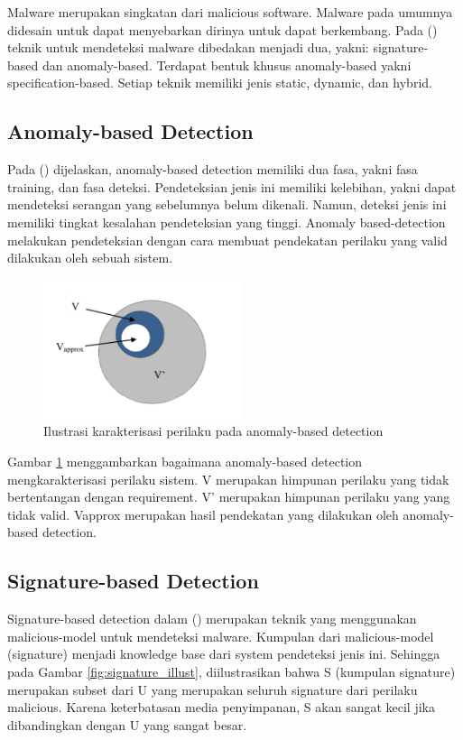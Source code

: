 Malware merupakan singkatan dari malicious software. Malware pada umumnya didesain untuk dapat menyebarkan dirinya untuk dapat berkembang. Pada (\cite{idika2007survey}) teknik untuk mendeteksi malware dibedakan menjadi dua, yakni: signature-
based dan anomaly-based. Terdapat bentuk khusus anomaly-based yakni specification-based. Setiap teknik memiliki jenis static, dynamic, dan hybrid.

\subsection{Anomaly-based Detection}

Pada (\cite{idika2007survey}) dijelaskan, anomaly-based detection memiliki dua fasa, yakni fasa training, dan fasa deteksi. Pendeteksian jenis ini memiliki kelebihan, yakni dapat mendeteksi serangan yang sebelumnya belum dikenali. Namun, deteksi jenis ini memiliki tingkat kesalahan pendeteksian yang tinggi. Anomaly based-detection melakukan pendeteksian dengan cara membuat pendekatan perilaku yang valid dilakukan oleh sebuah sistem.

\begin{figure}[H]
	\centering
	\includegraphics[width=220px]{resources/anomaly_illustration.png}
	\caption{Ilustrasi karakterisasi perilaku pada anomaly-based detection}
	\label{fig:anomaly_illust}
\end{figure}

Gambar \ref{fig:anomaly_illust} menggambarkan bagaimana anomaly-based detection mengkarakterisasi perilaku sistem. V merupakan himpunan perilaku yang tidak bertentangan dengan requirement. V’ merupakan himpunan perilaku yang yang tidak valid. Vapprox merupakan hasil pendekatan yang dilakukan oleh anomaly-based detection.

\subsection{Signature-based Detection}
Signature-based detection dalam (\cite{idika2007survey}) merupakan teknik yang menggunakan malicious-model untuk mendeteksi malware. Kumpulan dari malicious-model (signature) menjadi knowledge base dari system pendeteksi jenis ini. Sehingga pada Gambar \ref{fig:signature_illust}, diilustrasikan bahwa S (kumpulan signature) merupakan subset dari U yang merupakan seluruh signature dari perilaku malicious. Karena keterbatasan media penyimpanan, S akan sangat kecil jika dibandingkan dengan U yang sangat besar.

